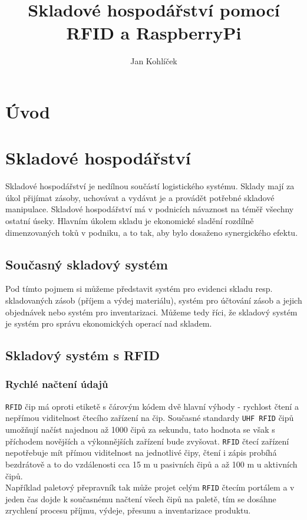 \documentclass[czech,BP]{thesiskiv}
\author{Jan Kohlíček}
\title{Skladové hospodářství pomocí RFID a RaspberryPi}
\begin{document}
\maketitle
\tableofcontents


\chapter{Úvod}

	
\chapter{Skladové hospodářství}
Skladové hospodářství je nedílnou součástí logistického systému. Sklady mají za úkol přijímat zásoby, uchovávat a vydávat je a provádět potřebné skladové manipulace. Skladové hospodářství má v podnicích návaznost na téměř všechny ostatní úseky. Hlavním úkolem skladu je ekonomické sladění rozdílně dimenzovaných toků v podniku, a to tak, aby bylo dosaženo synergického efektu.\cite{vitek2007skladove}


\section{Současný skladový systém}
Pod tímto pojmem si můžeme představit systém pro evidenci skladu resp. skladovaných zásob (příjem  a  výdej  materiálu), systém pro účtování zásob a jejich objednávek nebo systém pro inventarizaci. Můžeme tedy říci, že skladový systém je systém pro správu ekonomických operací nad skladem.\cite{hron2014skladovy}


\section{Skladový systém s RFID}

\subsection{Rychlé načtení údajů}
\texttt{RFID} čip má oproti etiketě s čárovým kódem dvě hlavní výhody - rychlost čtení a nepřímou viditelnost čtecího zařízení na čip. Současné standardy \texttt{UHF RFID} čipů umožňují načíst najednou až 1000 čipů za sekundu, tato hodnota se však s příchodem novějších a výkonnějších zařízení bude zvyšovat. \texttt{RFID} čtecí zařízení nepotřebuje mít přímou viditelnost na jednotlivé čipy, čtení i zápis probíhá bezdrátově a to do vzdálenosti cca 15 m u pasivních čipů a až 100 m u aktivních čipů.\cite{dolevcek2010identifikace}
\\
Například paletový přepravník tak může projet celým \texttt{RFID} čtecím portálem a v jeden čas dojde k současnému načtení všech čipů na paletě, tím se dosáhne zrychlení procesu příjmu, výdeje, přesunu a inventarizace produktu.\cite{dolevcek2010identifikace}
\end{document}
